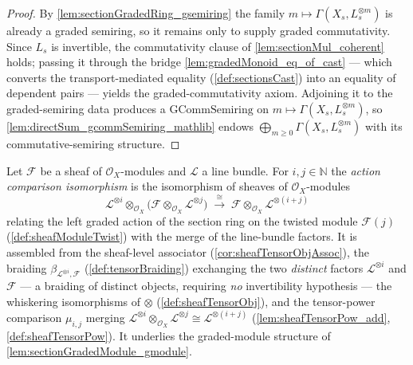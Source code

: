 \begin{proof}
    \leanok
  By \cref{lem:sectionGradedRing_gsemiring} the family
  \(m \mapsto \Gamma(X_s, L_s^{\otimes m})\) is already a graded semiring, so it
  remains only to supply graded commutativity. Since \(L_s\) is invertible, the
  commutativity clause of \cref{lem:sectionMul_coherent} holds; passing it through
  the bridge \cref{lem:gradedMonoid_eq_of_cast} --- which converts the
  transport-mediated equality (\cref{def:sectionsCast}) into an equality of
  dependent pairs --- yields the graded-commutativity axiom. Adjoining it to the
  graded-semiring data produces a \(\mathrm{GCommSemiring}\) on
  \(m \mapsto \Gamma(X_s, L_s^{\otimes m})\), so
  \cref{lem:directSum_gcommSemiring_mathlib} endows
  \(\bigoplus_{m \ge 0} \Gamma(X_s, L_s^{\otimes m})\) with its commutative-semiring
  structure.
\end{proof}

\begin{definition}
  \label{def:moduleTensorPowAdd}
  Let \(\mathcal{F}\) be a sheaf of \(\mathcal{O}_X\)-modules and \(\mathcal{L}\) a
  line bundle. For \(i, j \in \mathbb{N}\) the \emph{action comparison
  isomorphism} is the isomorphism of sheaves of \(\mathcal{O}_X\)-modules
  \[
    \mathcal{L}^{\otimes i} \otimes_{\mathcal{O}_X}
      \bigl(\mathcal{F} \otimes_{\mathcal{O}_X} \mathcal{L}^{\otimes j}\bigr)
    \;\xrightarrow{\ \cong\ }\;
    \mathcal{F} \otimes_{\mathcal{O}_X} \mathcal{L}^{\otimes (i+j)}
  \]
  relating the left graded action of the section ring on the twisted module
  \(\mathcal{F}(j)\) (\cref{def:sheafModuleTwist}) with the merge of the
  line-bundle factors. It is assembled from the sheaf-level associator
  (\cref{cor:sheafTensorObjAssoc}), the braiding
  \(\beta_{\mathcal{L}^{\otimes i},\mathcal{F}}\) (\cref{def:tensorBraiding})
  exchanging the two \emph{distinct} factors \(\mathcal{L}^{\otimes i}\) and
  \(\mathcal{F}\) --- a braiding of distinct objects, requiring \emph{no}
  invertibility hypothesis --- the whiskering isomorphisms of \(\otimes\)
  (\cref{def:sheafTensorObj}), and the tensor-power comparison \(\mu_{i,j}\)
  merging \(\mathcal{L}^{\otimes i} \otimes_{\mathcal{O}_X} \mathcal{L}^{\otimes j}
  \cong \mathcal{L}^{\otimes (i+j)}\) (\cref{lem:sheafTensorPow_add},
  \cref{def:sheafTensorPow}). It underlies the graded-module
  structure of \cref{lem:sectionGradedModule_gmodule}.
\end{definition}

